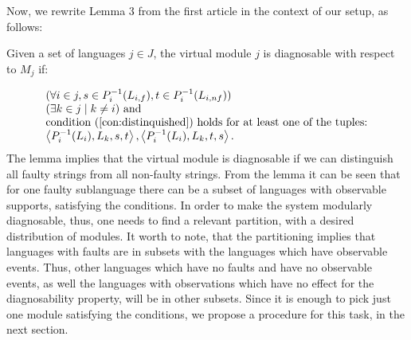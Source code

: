 \documentclass[a4paper, 10pt, conference]{ieeeconf}
\begin{document}
Now, we rewrite Lemma 3 from the first article in the context of our setup, as
follows:
\begin{lemma}
\label{lem:virtual_module_is_diagnosable}
Given a set of languages $j \in J$, the virtual module $j$ is diagnosable with
respect to $M_j$ if:
\end{lemma}
\begin{equation}
	\begin{array}{l}
		(\forall i \in j, 
			s \in P_i^{-1}(L_{i,f}), 
			t \in P_i^{-1}(L_{i,nf}))
		\\
		(\exists k \in j \mid k \neq i) \textrm{ and }
		\\
		\textrm{condition (\ref{con:distinquished}) holds for at least one of
		the tuples:}
		\\
		\left<P_i^{-1}(L_i), L_k, s, t \right>,
		\left<P_i^{-1}(L_i), L_k, t, s \right>.
	\end{array}
\end{equation}
The lemma implies that the virtual module is diagnosable if we can distinguish
all faulty strings from all non-faulty strings. 
From the lemma it can be seen that for one faulty sublanguage there can be a
subset of languages with observable supports, satisfying the conditions. In
order to make the system modularly diagnosable, thus, one needs to find a
relevant partition, with a desired distribution of modules. It worth to note,
that the partitioning implies that languages with faults are in subsets with the
languages which have observable events. Thus, other languages which have no
faults and have no observable events, as well the languages with observations
which have no effect for the diagnosability property, will be in other subsets.
Since it is enough to pick just one module satisfying the conditions, we
propose a procedure for this task, in the next section.
\end{document}
